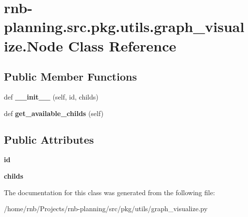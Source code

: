 \hypertarget{classrnb-planning_1_1src_1_1pkg_1_1utils_1_1graph__visualize_1_1_node}{}\section{rnb-\/planning.src.\+pkg.\+utils.\+graph\+\_\+visualize.\+Node Class Reference}
\label{classrnb-planning_1_1src_1_1pkg_1_1utils_1_1graph__visualize_1_1_node}
\subsection*{Public Member Functions}
\begin{DoxyCompactItemize}
\item 
\mbox{\label{classrnb-planning_1_1src_1_1pkg_1_1utils_1_1graph__visualize_1_1_node_a12ff4fcbbc9b132898d505437010d29e}} 
def {\bfseries \+\_\+\+\_\+init\+\_\+\+\_\+} (self, id, childs)
\item 
\mbox{\label{classrnb-planning_1_1src_1_1pkg_1_1utils_1_1graph__visualize_1_1_node_ad8a0123c88711050176cf667a316b1f0}} 
def {\bfseries get\+\_\+available\+\_\+childs} (self)
\end{DoxyCompactItemize}
\subsection*{Public Attributes}
\begin{DoxyCompactItemize}
\item 
\mbox{\label{classrnb-planning_1_1src_1_1pkg_1_1utils_1_1graph__visualize_1_1_node_aab0df5d07d8cc87c410810af9273fa9b}} 
{\bfseries id}
\item 
\mbox{\label{classrnb-planning_1_1src_1_1pkg_1_1utils_1_1graph__visualize_1_1_node_acb50115207558681896788e712400424}} 
{\bfseries childs}
\end{DoxyCompactItemize}


The documentation for this class was generated from the following file\+:\begin{DoxyCompactItemize}
\item 
/home/rnb/\+Projects/rnb-\/planning/src/pkg/utils/graph\+\_\+visualize.\+py\end{DoxyCompactItemize}
